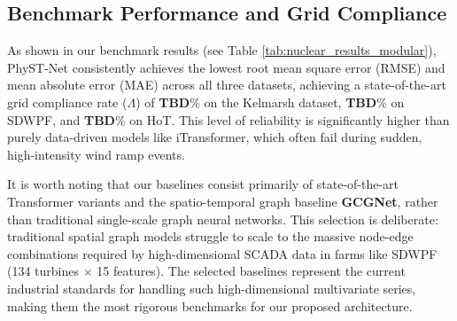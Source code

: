\subsection{Benchmark Performance and Grid Compliance}
\label{sec:benchmark}
As shown in our benchmark results (see Table \ref{tab:nuclear_results_modular}), PhyST-Net consistently achieves the lowest root mean square error (RMSE) and mean absolute error (MAE) across all three datasets, achieving a state-of-the-art grid compliance rate ($\Lambda$) of \textbf{TBD}\% on the Kelmarsh dataset, \textbf{TBD}\% on SDWPF, and \textbf{TBD}\% on HoT. This level of reliability is significantly higher than purely data-driven models like iTransformer, which often fail during sudden, high-intensity wind ramp events. 

It is worth noting that our baselines consist primarily of state-of-the-art Transformer variants and the spatio-temporal graph baseline \textbf{GCGNet}, rather than traditional single-scale graph neural networks. This selection is deliberate: traditional spatial graph models struggle to scale to the massive node-edge combinations required by high-dimensional SCADA data in farms like SDWPF (134 turbines $\times$ 15 features). The selected baselines represent the current industrial standards for handling such high-dimensional multivariate series, making them the most rigorous benchmarks for our proposed architecture.


